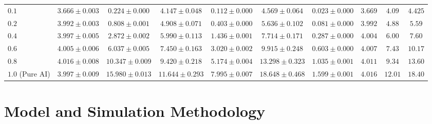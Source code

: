 \documentclass
[letterpaper]{article}
\begin{document}
\begin{table}[t]
{\begin{tabular}{@{}lccccccccc@{}}
\midrule
$0.1$ & $3.666 \pm 0.003$ & $0.224 \pm 0.000$ & $4.147 \pm 0.048$ & $0.112 \pm 0.000$ & $4.569 \pm 0.064$ & $0.023 \pm 0.000$ & $3.669$ & $4.09$ & $4.425$ \\
$0.2$ & $3.992 \pm 0.003$ & $0.808 \pm 0.001$ & $4.908 \pm 0.071$ & $0.403 \pm 0.000$ & $5.636 \pm 0.102$ & $0.081 \pm 0.000$ & $3.992$ & $4.88$ & $5.59$ \\
$0.4$ & $3.997 \pm 0.005$ & $2.872 \pm 0.002$ & $5.990 \pm 0.113$ & $1.436 \pm 0.001$ & $7.714 \pm 0.171$ & $0.287 \pm 0.000$ & $4.004$ & $6.00$ & $7.60$ \\
$0.6$ & $4.005 \pm 0.006$ & $6.037 \pm 0.005$ & $7.450 \pm 0.163$ & $3.020 \pm 0.002$ & $9.915 \pm 0.248$ & $0.603 \pm 0.000$ & $4.007$ & $7.43$ & $10.17$ \\
$0.8$ & $4.016 \pm 0.008$ & $10.347 \pm 0.009$ & $9.420 \pm 0.218$ & $5.174 \pm 0.004$ & $13.298 \pm 0.323$ & $1.035 \pm 0.001$ & $4.011$ & $9.34$ & $13.60$ \\
$1.0$ (Pure AI) & $\mathbf{3.997 \pm 0.009}$ & $\mathbf{15.980 \pm 0.013}$ & $\mathbf{11.644 \pm 0.293}$ & $\mathbf{7.995 \pm 0.007}$ & $\mathbf{18.648 \pm 0.468}$ & $\mathbf{1.599 \pm 0.001}$ & $\mathbf{4.016}$ & $\mathbf{12.01}$ & $\mathbf{18.40}$ \\
\bottomrule
\end{tabular}%
}
\label{tab:macro_results}
\end{table}

\section{Model and Simulation Methodology}
\end{document}
